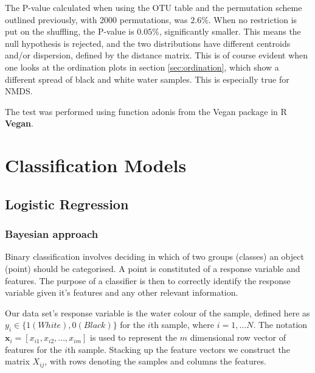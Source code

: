 The P-value calculated when using the OTU table and the permutation scheme outlined previously, with 2000 permutations, was $2.6\%$. When no restriction is put on the shuffling, the P-value is $0.05\%$, significantly smaller. This means the null hypothesis is rejected, and the two distributions have different centroids and/or dispersion, defined by the distance matrix. This is of course evident when one looks at the ordination plots in section \ref{sec:ordination}, which show a different spread of black and white water samples. This is especially true for NMDS.

The test was performed using function adonis from the Vegan package in R \textbf{Vegan}.
\section{Classification Models}
\label{sec:classification}
\subsection{Logistic Regression}
\subsubsection{Bayesian approach}
Binary classification involves deciding in which of two groups (classes) an object (point) should be categorised. A point is constituted of a response variable and features. The purpose of a classifier is then to correctly identify the response variable given it's features and any other relevant information. 

Our data set's response variable is the water colour of the sample, defined here as $y_i \in \{ 1 (White),0 (Black)\}$ for the $i$th sample, where $i=1,...N$. The notation $ \mathbf{x}_i = [x_{i1},x_{i2},...,x_{im}]$ is used to represent the $m$ dimensional row vector of features for the $i$th sample. Stacking up the feature vectors we construct the matrix $X_{ij}$, with rows denoting the samples and columns the features.

